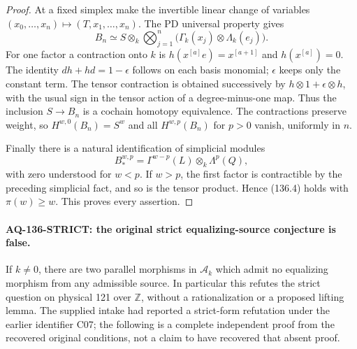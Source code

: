 \documentclass[11pt,a4paper]{article}
\theoremstyle{definition}\newtheorem{definition}[theorem]{Definition}
\theoremstyle{remark}\newtheorem{remark}[theorem]{Remark}
\begin{document}
\begin{proof}
At a fixed simplex make the invertible linear change of
variables $(x_0,\ldots,x_n)\mapsto(T,x_1,\ldots,x_n)$.
The PD universal property gives
\[
 B_n\simeq S\otimes_k\bigotimes_{j=1}^n
            \bigl(\Gamma_k(x_j)\otimes\Lambda_k(e_j)\bigr).
                                                               \tag{136.6}
\]
For one factor a contraction onto $k$ is
$h(x^{[a]}e)=x^{[a+1]}$ and $h(x^{[a]})=0$.
The identity $dh+hd=1-\epsilon$ follows on each basis
monomial; $\epsilon$ keeps only the constant term.
The tensor contraction is obtained successively by
$h\otimes1+\epsilon\otimes h$, with the usual sign in the
tensor action of a degree-minus-one map.  Thus the inclusion
$S\to B_n$ is a cochain homotopy equivalence.  The contractions
preserve weight, so $H^{w,0}(B_n)=S^w$ and all
$H^{w,p}(B_n)$ for $p>0$ vanish, uniformly in $n$.

Finally there is a natural identification of simplicial modules
\[
 B_*^{w,p}=\Gamma^{w-p}(L)\otimes_k\Lambda^p(Q),             \tag{136.7}
\]
with zero understood for $w<p$.  If $w>p$, the first factor
is contractible by the preceding simplicial fact, and so is
the tensor product.  Hence (136.4) holds with
$\pi(w)\geq w$.  This proves every assertion.
\end{proof}

\paragraph{AQ-136-STRICT: the original strict equalizing-source conjecture is false.}
If $k\ne0$, there are two parallel morphisms in
$\mathcal A_k$ which admit no equalizing morphism from any
admissible source.  In particular this refutes the strict
question on physical 121 over $\mathbb Z$, without a
rationalization or a proposed lifting lemma.
The supplied intake had reported a strict-form refutation
under the earlier identifier C07; the following is a complete
independent proof from the recovered original conditions,
not a claim to have recovered that absent proof.
\end{document}
